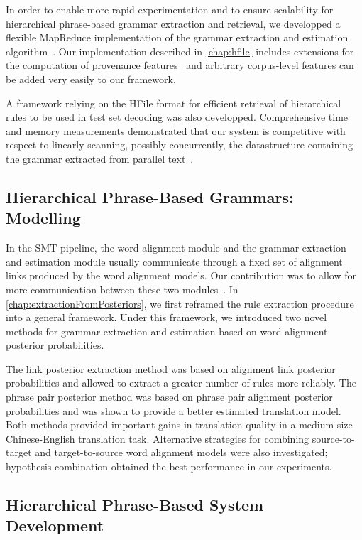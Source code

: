In order to enable more rapid experimentation and to ensure
scalability for hierarchical phrase-based grammar extraction
and retrieval, we developped a flexible MapReduce implementation
of the grammar extraction and estimation
algorithm~\citep{dyer-cordova-mont-lin:2008:WMT}.
Our implementation described in \autoref{chap:hfile} includes
extensions for the computation
of provenance
features~\citep{chiang-deneefe-pust:2011:ACL} and arbitrary
corpus-level features can be added very easily to our framework.

A framework relying on the HFile format
for efficient retrieval of hierarchical rules to
be used in test set decoding was also developped.
Comprehensive time and memory measurements demonstrated
that our system is competitive with respect to linearly
scanning, possibly concurrently, the datastructure containing
the grammar extracted from parallel
text~\citep{pino-waite-byrne:2012:PBML}.

\subsection{Hierarchical Phrase-Based Grammars: Modelling}

In the SMT pipeline, the word alignment module and
the grammar extraction and estimation module usually
communicate through a fixed set of alignment links
produced by the word alignment models. Our contribution
was to allow for more communication between these two
modules~\citep{degispert-pino-byrne:2010:EMNLP}.
In \autoref{chap:extractionFromPosteriors}, we
first reframed the rule extraction procedure
into a general framework. Under this framework, we
introduced two novel methods for grammar extraction
and estimation based on word alignment posterior
probabilities.

The link posterior extraction method was based on alignment
link posterior probabilities and allowed to extract
a greater number of rules more reliably. The phrase pair
posterior method was based on phrase pair alignment posterior
probabilities and was shown to provide a better estimated
translation model. Both methods provided important gains in
translation quality in
a medium size Chinese-English translation task.
Alternative strategies for combining source-to-target
and target-to-source word alignment models were also
investigated; hypothesis combination obtained the best
performance in our experiments.

\subsection{Hierarchical Phrase-Based System Development}


